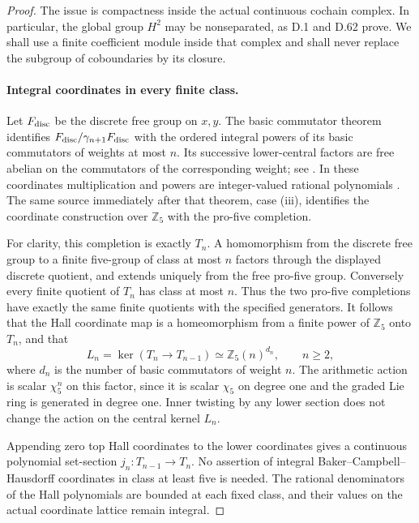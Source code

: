 \begin{proof}
The issue is compactness inside the actual continuous
cochain complex. In particular, the global group
\(H^2\) may be nonseparated, as D.1 and D.62 prove.
We shall use a finite coefficient module inside
that complex and shall never replace the subgroup
of coboundaries by its closure.

\paragraph{Integral coordinates in every finite class.}
Let \(F_{\rm disc}\) be the discrete free group on
\(x,y\). The basic commutator theorem identifies
\(F_{\rm disc}/\gamma_{n+1}F_{\rm disc}\) with the
ordered integral powers of its basic commutators
of weights at most \(n\). Its successive
lower-central factors are free abelian on the
commutators of the corresponding weight; see
\cite[Theorem 5.6 and its corollary]{DE_HallEdmonton}.
In these coordinates multiplication and powers
are integer-valued rational polynomials
\cite[Theorem 6.5]{DE_HallEdmonton}. The same
source immediately after that theorem, case (iii),
identifies the coordinate construction over
\(\mathbb Z_5\) with the pro-five completion.

For clarity, this completion is exactly \(T_n\).
A homomorphism from the discrete free group to
a finite five-group of class at most \(n\)
factors through the displayed discrete quotient,
and extends uniquely from the free pro-five
group. Conversely every finite quotient of
\(T_n\) has class at most \(n\). Thus the two
pro-five completions have exactly the same
finite quotients with the specified generators.
It follows that the Hall coordinate map is a
homeomorphism from a finite power of
\(\mathbb Z_5\) onto \(T_n\), and that
\[
 L_n=\ker(T_n\longrightarrow T_{n-1})
       \simeq\mathbb Z_5(n)^{d_n},\qquad n\ge2,
                                                        \tag{D.68.3}
\]
where \(d_n\) is the number of basic commutators
of weight \(n\). The arithmetic action is scalar
\(\chi_5^n\) on this factor, since it is scalar
\(\chi_5\) on degree one and the graded Lie ring
is generated in degree one. Inner twisting by
any lower section does not change the action
on the central kernel \(L_n\).

Appending zero top Hall coordinates to the
lower coordinates gives a continuous polynomial set-section
\(j_n:T_{n-1}\to T_n\). No assertion of integral
Baker--Campbell--Hausdorff coordinates in class
at least five is needed. The rational denominators
of the Hall polynomials are bounded at each
fixed class, and their values on the actual
coordinate lattice remain integral.


\end{proof}
